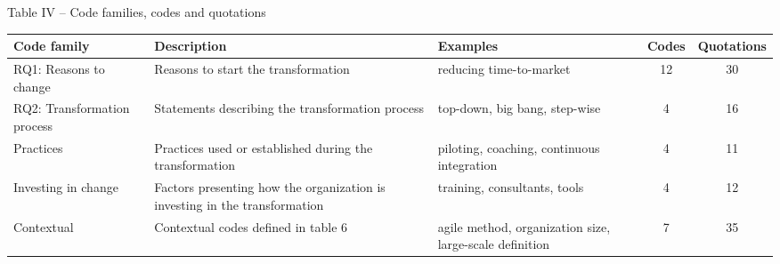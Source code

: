 \centering
Table IV – Code families, codes and quotations

\begin{center}
    \begin{tabular}{l p{10em} p{11em} c c }
        \bfseries{Code family} & \bfseries{Description} & \bfseries{Examples} & \bfseries{Codes} & \bfseries{Quotations}\\
        \hline
        RQ1: Reasons to change & Reasons to start the transformation & reducing time-to-market & 12& 30 \\
        RQ2: Transformation process & Statements describing the transformation process & top-down, big bang, step-wise & 4 & 16 \\
        Practices & Practices used or established during the transformation & piloting, coaching, continuous integration & 4 & 11 \\
        Investing in change & Factors presenting how the organization is investing in the transformation & training, consultants, tools & 4 & 12 \\
        Contextual & Contextual codes defined in table 6 & agile method, organization size, large-scale definition & 7 & 35 \\
        \hline
    \end{tabular}
\end{center}
\justify
